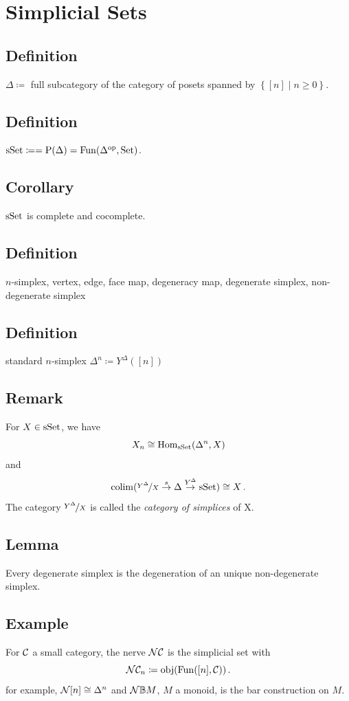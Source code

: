 \chapter{Simplicial Sets}
    \section{Definition}
        $\Delta \coloneq$ full subcategory of the category of posets spanned by $\left\{[n] \mid n \geq 0\right\}$.
    \section{Definition}
        $\operatorname{sSet} \coloneq = \mathrm{P}(\Delta) = \operatorname{Fun}(\Delta^{\operatorname{op}}, \operatorname{Set})$.
    \section{Corollary}
        $\operatorname{sSet}$ is complete and cocomplete.
    \section{Definition}
        $n$-simplex, vertex, edge, face map, degeneracy map, degenerate simplex, non-degenerate simplex
    \section{Definition}
        standard $n$-simplex $\Delta^n \coloneq Y^{\Delta}([n])$
    \section{Remark}
        For $X \in \operatorname{sSet}$, we have
        \begin{equation*}
            X_n \cong \operatorname{Hom}_{\operatorname{sSet}}(\Delta^n, X)
        \end{equation*}
        and
        \begin{equation*}
            \operatorname*{colim}(\nicefrac{Y^{\Delta}}{X} \overset{s}{\rightarrow} \Delta \overset{Y^{\Delta}}{\rightarrow} \operatorname{sSet}) \cong X \,.
        \end{equation*}
        The category $\nicefrac{Y^{\Delta}}{X}$ is called the \emph{category of simplices} of X.
    \section{Lemma}
        Every degenerate simplex is the degeneration of an unique non-degenerate simplex.
    \section{Example}\label{chII-8}
        For $\mathcal{C}$ a small category, the nerve $\mathcal{N}\mathcal{C}$ is the simplicial set with
        \begin{equation*}
            \mathcal{N}\mathcal{C}_n \coloneq \operatorname{obj}(\operatorname{Fun}([n], \mathcal{C})) \,.
        \end{equation*}
        for example, $\mathcal{N}[n] \cong \Delta^n$ and $\mathcal{N}\mathbb{B}M$, $M$ a monoid, is the bar construction on $M$.
